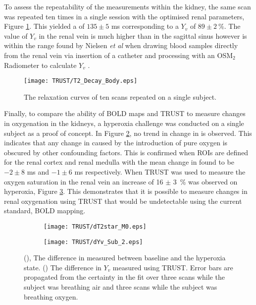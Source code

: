 To assess the repeatability of the measurements within the kidney, the same scan was repeated ten times in a single session with the optimised renal parameters, Figure \ref{fig:T2_Decay_Body}. This yielded a \ttwo of $135\pm5$ ms corresponding to a $Y_v$ of $89\pm2~\%$. The value of $Y_v$ in the renal vein is much higher than in the sagittal sinus however is within the range found by Nielsen \textit{et al} when drawing blood samples directly from the renal vein via insertion of a catheter and processing with an OSM$_2$ Radiometer to calculate $Y_v$ \cite{nielsen_renal_1992, saloojee_evaluation_1981}.

\begin{figure}[H]
	\centering
	\texttt{[image: TRUST/T2\_Decay\_Body.eps]}
	\caption{The \ttwo relaxation curves of ten scans repeated on a single subject.}
	\label{fig:T2_Decay_Body}	
\end{figure}

Finally, to compare the ability of \ac{BOLD} \ttwostar maps and \ac{TRUST} to measure changes in oxygenation in the kidneys, a hyperoxia challenge was conducted on a single subject as a proof of concept. In Figure \ref{fig:dT2star}, no trend in change in \ttwostar is observed. This indicates that any change in \ttwostar caused by the introduction of pure oxygen is obscured by other confounding factors. This is confirmed when \acp{ROI} are defined for the renal cortex and renal medulla with the mean change in \ttwostar found to be $-2 \pm 8$ ms and $-1 \pm 6$ ms respectively. When \ac{TRUST} was used to measure the oxygen saturation in the renal vein an increase of 16 $\pm$ 3~\% was observed on hyperoxia, Figure \ref{fig:dYv}. This demonstrates that it is possible to measure changes in renal oxygenation using \ac{TRUST} that would be undetectable using the current standard, \ac{BOLD} \ttwostar mapping.
\begin{figure}[H]
	\centering
	\begin{subfigure}[c]{0.47\textwidth}
		\centering
		\texttt{[image: TRUST/dT2star\_M0.eps]}
		\caption{}
		\label{fig:dT2star}
	\end{subfigure}
	\hfill
	\begin{subfigure}[c]{0.47\textwidth}
		\centering
		\texttt{[image: TRUST/dYv\_Sub\_2.eps]}
		\caption{}
		\label{fig:dYv}
	\end{subfigure}
	\caption{(), The difference in \ttwostar measured between baseline and the hyperoxia state. () The difference in $Y_v$ measured using \ac{TRUST}. Error bars are propagated from the certainty in the fit \ttwo over three scans while the subject was breathing air and three scans while the subject was breathing oxygen.}
	\label{fig:oxygen_chalenge_results}
\end{figure}

